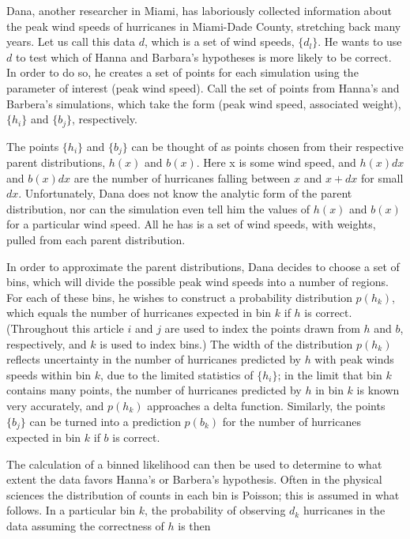\documentclass[twocolumn,twoside,prd]{revtex4} %
\begin{document}
Dana, another researcher in Miami, has laboriously collected information about the peak wind speeds of hurricanes in Miami-Dade County, stretching back many years.  Let us call this data $d$, which is a set of wind speeds, $\{ d_l \}$. He wants to use $d$ to test which of Hanna and Barbara's hypotheses is more likely to be correct.  In order to do so, he creates a set of points for each simulation using the parameter of interest (peak wind speed).  Call the set of points from Hanna's and Barbera's simulations, which take the form (peak wind speed, associated weight), $\{ h_i \}$ and $\{ b_j \}$, respectively.  

The points $\{ h_i \}$ and $\{ b_j \}$ can be thought of as points chosen from their respective parent distributions,  $h(x)$ and $b(x)$.  Here x is some wind speed, and $h(x)dx$ and $b(x)dx$ are the number of hurricanes falling between  $x$ and $x+dx$ for small $dx$.  Unfortunately, Dana does not know the analytic form of the parent distribution, nor can the simulation even tell him the values of $h(x)$ and $b(x)$ for a particular wind speed.  All he has is a set of wind speeds, with weights, pulled from each parent distribution.

In order to approximate the parent distributions, Dana decides to choose a set of bins, which will divide the possible peak wind speeds into a number of regions.  For each of these bins, he wishes to construct a probability distribution $p(h_k)$, which equals the number of hurricanes expected in bin $k$ if $h$ is correct. (Throughout this article $i$ and $j$ are used to index the points drawn from $h$ and $b$, respectively, and $k$ is used to index bins.)  The width of the distribution $p(h_k)$ reflects uncertainty in the number of hurricanes predicted by $h$ with peak winds speeds within bin $k$, due to the limited statistics of $\{ h_i \}$; in the limit that bin $k$ contains many points, the number of hurricanes predicted by $h$ in bin $k$ is known very accurately, and $p(h_k)$ approaches a delta function.  Similarly, the points $\{ b_j \}$ can be turned into a prediction $p(b_k)$ for the number of hurricanes expected in bin $k$ if $b$ is correct.

The calculation of a binned likelihood can then be used to determine to what extent the data favors Hanna's or Barbera's hypothesis.  Often in the physical sciences the distribution of counts in each bin is Poisson; this is assumed in what follows.  In a particular bin $k$, the probability of observing $d_k$ hurricanes in the data assuming the correctness of $h$ is then
\end{document}
